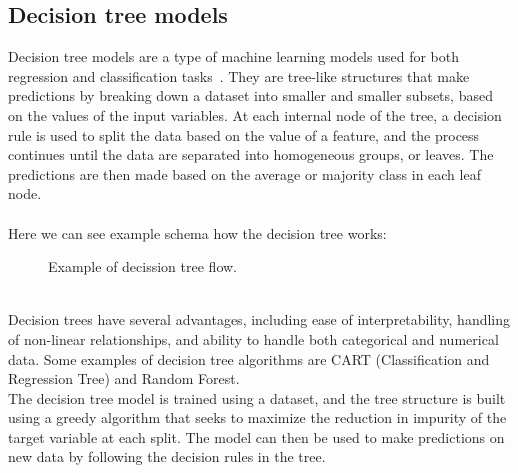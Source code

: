 \subsection{Decision tree models} \label{sec:trees}
Decision tree models are a type of machine learning models used for both regression and classification
tasks~\cite{Kotsiantis}. They are tree-like structures that make predictions by breaking down a dataset into
smaller and smaller subsets, based on the values of the input variables. At each internal node of the tree,
a decision rule is used to split the data based on the value of a feature, and the process continues until the
data are separated into homogeneous groups, or leaves.
The predictions are then made based on the average or majority class in each leaf node.\\
\\
Here we can see example schema how the decision tree works: \\
\begin{figure}
    \centering
    \caption{Example of decission tree flow.}
    \label{fig:example_tree}
\end{figure}
\\
Decision trees have several advantages, including ease of interpretability, handling of non-linear relationships,
and ability to handle both categorical and numerical data. Some examples of decision tree algorithms are CART
(Classification and Regression Tree) and Random Forest.
\\
The decision tree model is trained using a dataset, and the tree structure is built using a greedy algorithm
that seeks to maximize the reduction in impurity of the target variable at each split. The model can then be used
to make predictions on new data by following the decision rules in the tree.

